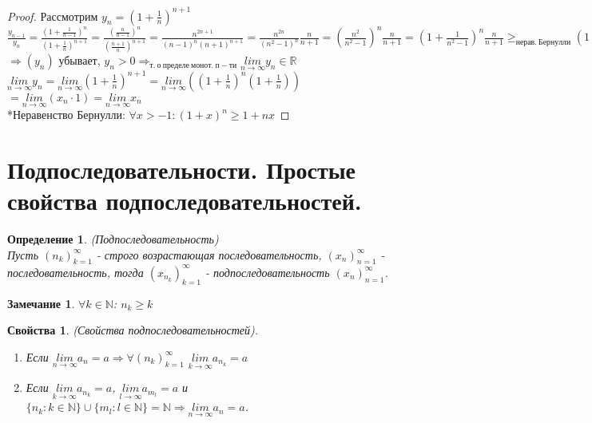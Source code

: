 \documentclass[11pt,a4paper,titlepage]{article}
\newtheorem*{definition}{Определение}
\newtheorem*{remark}{Замечание}
\newtheorem*{properties}{Свойства}
\renewcommand{\lim}[2]{\underset{#1 \rightarrow #2}{lim}}
\newcommand{\limn}{\lim{n}{\infty}}
\renewcommand{\implies}{\Rightarrow}
\newcommand{\R}{\mathbb{R}}
\newcommand{\N}{\mathbb{N}}
\begin{document}
    \begin{proof}

        Рассмотрим $y_n = (1 + \frac{1}{n})^{n+1}$\\
        $\frac{y_{n-1}}{y_n} = \frac{(1 + \frac{1}{n-1})^n}{(1 + \frac{1}{n})^{n+1}}=\frac{(\frac{n}{n-1})^n}{(\frac{n+1}{n})^{n+1}}=\frac{n^{2n+1}}{(n-1)^n (n+1)^{n+1}} = \frac{n^{2n}}{(n^2-1)^n} \frac{n}{n+1} = (\frac{n^2}{n^2-1})^n \frac{n}{n+1} = (1 + \frac{1}{n^2-1})^n \frac{n}{n+1} \geq_{нерав.\ Бернулли} (1+\frac{n}{n^2-1}) \frac{n}{n+1} = \frac{n^2+n-1}{n^2-1} \frac{n}{n+1} = \frac{n^3+n^2-n}{n^3+n^2-n-1} \geq 1$\\$ \implies (y_n)$ убывает, $y_n > 0 \implies_{т.\ о\ пределе\ монот.\ п-ти} \limn y_n \in \R$\\

        $\limn y_n = \limn (1 + \frac{1}{n})^{n+1} = \limn ((1 + \frac{1}{n})^n (1 + \frac{1}{n}))$\\$ = \limn (x_n \cdot 1) = \limn x_n$\\

        *Неравенство Бернулли: $\forall x > -1: (1+x)^n \geq 1 + nx$

    \end{proof}


    \section{Подпоследовательности. Простые свойства подпоследовательностей.}

    \begin{definition}
        (Подпоследовательность)\\
        Пусть $(n_k)_{k=1}^\infty$ - строго возрастающая последовательность, $(x_n)_{n=1}^\infty$ - последовательность, тогда $(x_{n_k})_{k=1}^\infty$ - подпоследовательность $(x_n)_{n=1}^\infty$.
    \end{definition}

    \begin{remark}
        $\forall k \in \N$: $ n_k \geq k$
    \end{remark}

    \begin{properties}
        (Свойства подпоследовательностей).
        \begin{enumerate}

            \item Если $\limn a_n = a \Rightarrow \forall (n_k)_{k=1}^\infty$ $\lim{k}{\infty}a_{n_k} = a$

            \item Если $\lim{k}{\infty}a_{n_k} = a$, $\lim{l}{\infty}a_{m_l} = a$ и $\{n_k:k\in\N\}\cup \{m_l:l\in\N\} = \N \Rightarrow \limn a_n = a$.

        \end{enumerate}
    \end{properties}
\end{document}
